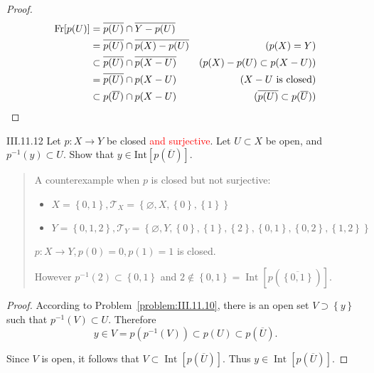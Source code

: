 \begin{proof}
	\begingroup
	\allowdisplaybreaks%
	\begin{align*}
		\operatorname{Fr}[p(U)] & = \overline{p(U)} \cap \overline{Y - p(U)}                                                   \\
		                        & = \overline{p(U)} \cap \overline{p(X) - p(U)}    & (p(X) = Y)                                \\
		                        & \subset \overline{p(U)} \cap \overline{p(X - U)} & (p(X) - p(U) \subset p(X - U))            \\
		                        & = \overline{p(U)} \cap p(X - U)                  & \text{(\( X - U \) is closed)}            \\
		                        & \subset p(\overline{U}) \cap p(X - U)            & (\overline{p(U)} \subset p(\overline{U}))
	\end{align*}
	\endgroup
\end{proof}

\begin{problem}{III.11.12}
Let \( p: X \to Y \) be closed \textcolor{red}{and surjective}. Let \( U \subset X \) be open, and \( p^{-1}(y) \subset U \). Show that \( y \in \text{Int}[p(\overline{U})] \).
\end{problem}

\begin{quote}
	A counterexample when \( p \) is closed but not surjective:
	\begin{itemize}
		\item \( X = \left\{ 0, 1 \right\}, \mathscr{T}_{X} = \left\{ \varnothing, X, \left\{ 0 \right\}, \left\{ 1 \right\} \right\} \)
		\item \( Y = \left\{ 0, 1, 2 \right\}, \mathscr{T}_{Y} = \left\{ \varnothing, Y, \left\{ 0 \right\}, \left\{ 1 \right\}, \left\{ 2 \right\}, \left\{ 0, 1 \right\}, \left\{ 0, 2 \right\}, \left\{ 1, 2 \right\} \right\} \)
	\end{itemize}
	\( p: X \to Y, p(0) = 0, p(1) = 1 \) is closed.

	However \( p^{-1}(2) \subset \left\{ 0, 1 \right\} \) and \( 2 \notin \left\{ 0, 1 \right\} = \operatorname{Int}\left\lbrack p(\overline{\left\{ 0, 1 \right\}}) \right\rbrack \).
\end{quote}

\begin{proof}
	According to Problem~\ref{problem:III.11.10}, there is an open set \( V \supset \left\{ y \right\} \) such that \( p^{-1}(V) \subset U \). Therefore
	\[
		y \in V = p(p^{-1}(V)) \subset p(U) \subset p(\overline{U}).
	\]

	Since \( V \) is open, it follows that \( V \subset \operatorname{Int}\left\lbrack p(\overline{U}) \right\rbrack \). Thus \( y \in \operatorname{Int}\left\lbrack p(\overline{U}) \right\rbrack \).
\end{proof}

